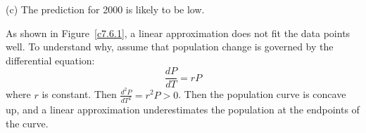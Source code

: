 \documentclass{ximera}
\begin{document}
\begin{computerExercise}
\begin{solution}
(c) \ans The prediction for 2000 is likely to be low.

\soln As shown in Figure~\ref{c7.6.1}, a linear approximation does not
fit the data points well.  To understand why, assume that population
change is governed by the differential equation:
\[
\frac{dP}{dT} = rP
\]
where $r$ is constant.  Then $\frac{d^2P}{dT^2} = r^2P > 0$.
Then the population curve is concave up, and a linear approximation
underestimates the population at the endpoints of the curve.

\begin{figure}[htb]
		\centerline{%
		}
\end{figure}

\end{solution}
\end{computerExercise}
\end{document}
